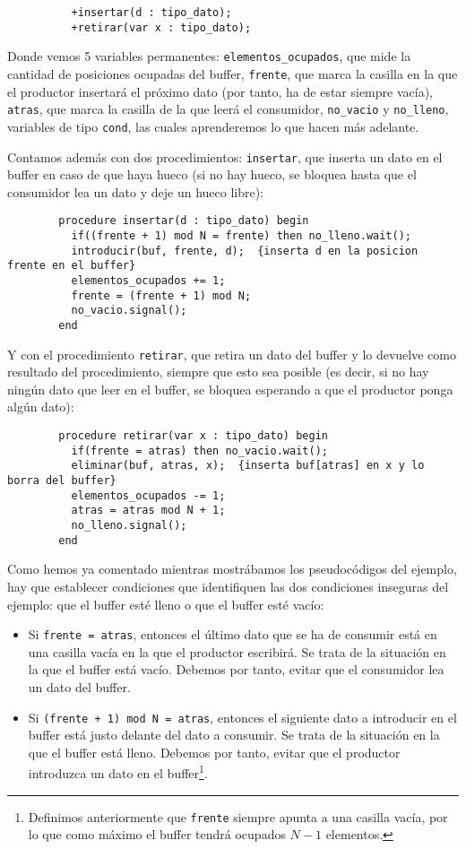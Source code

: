 \begin{ejemplo}
\begin{verbatim}
          +insertar(d : tipo_dato);
          +retirar(var x : tipo_dato);
    \end{verbatim}
    Donde vemos 5 variables permanentes: \verb|elementos_ocupados|, que mide la cantidad de posiciones ocupadas del buffer, \verb|frente|, que marca la casilla en la que el productor insertará el próximo dato (por tanto, ha de estar siempre vacía), \verb|atras|, que marca la casilla de la que leerá el consumidor, \verb|no_vacio| y \verb|no_lleno|, variables de tipo \verb|cond|, las cuales aprenderemos lo que hacen más adelante.
    
    Contamos además con dos procedimientos: \verb|insertar|, que inserta un dato en el buffer en caso de que haya hueco (si no hay hueco, se bloquea hasta que el consumidor lea un dato y deje un hueco libre):
    \begin{verbatim}
        procedure insertar(d : tipo_dato) begin
          if((frente + 1) mod N = frente) then no_lleno.wait();
          introducir(buf, frente, d);  {inserta d en la posicion frente en el buffer}
          elementos_ocupados += 1;
          frente = (frente + 1) mod N;
          no_vacio.signal();
        end
    \end{verbatim}
    Y con el procedimiento \verb|retirar|, que retira un dato del buffer y lo devuelve como resultado del procedimiento, siempre que esto sea posible (es decir, si no hay ningún dato que leer en el buffer, se bloquea esperando a que el productor ponga algún dato):
    \begin{verbatim}
        procedure retirar(var x : tipo_dato) begin
          if(frente = atras) then no_vacio.wait();
          eliminar(buf, atras, x);  {inserta buf[atras] en x y lo borra del buffer}
          elementos_ocupados -= 1;
          atras = atras mod N + 1;
          no_lleno.signal();
        end
    \end{verbatim}
    Como hemos ya comentado mientras mostrábamos los pseudocódigos del ejemplo, hay que establecer condiciones que identifiquen las dos condiciones inseguras del ejemplo: que el buffer esté lleno o que el buffer esté vacío:
    \begin{itemize}
        \item Si \verb|frente = atras|, entonces el último dato que se ha de consumir está en una casilla vacía en la que el productor escribirá. Se trata de la situación en la que el buffer está vacío. Debemos por tanto, evitar que el consumidor lea un dato del buffer.
        \item Si \verb|(frente + 1) mod N = atras|, entonces el siguiente dato a introducir en el buffer está justo delante del dato a consumir. Se trata de la situación en la que el buffer está lleno. Debemos por tanto, evitar que el productor introduzca un dato en el buffer\footnote{Definimos anteriormente que \texttt{frente} siempre apunta a una casilla vacía, por lo que como máximo el buffer tendrá ocupados $N-1$ elementos.}.

\end{itemize}
\end{ejemplo}
